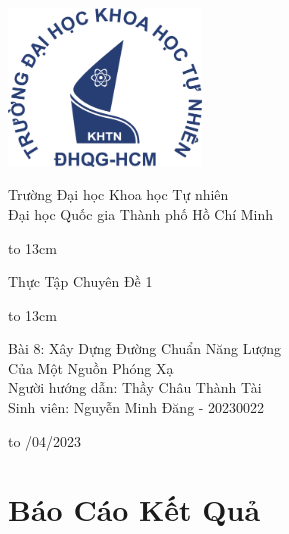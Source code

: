 \documentclass{article}
\begin{document}
\onehalfspacing
{
   \setlength{\topmargin}{-0.5cm}
\begin{titlepage}
  \begin{center}
    \centerline{\includegraphics[height=42mm]{logo}}

    
   \vspace{1cm}

        {\large Trường Đại học Khoa học Tự nhiên}\\[1em]
        {\large Đại học Quốc gia Thành phố Hồ Chí Minh}
    
        \vspace{1.2cm}
    \centerline{\hbox to 13cm{\hrulefill}}
    \vspace{0.3cm}
    \Large  {{Thực Tập Chuyên Đề 1 }}
    \centerline{\hbox to 13cm{\hrulefill}}
    
    \vspace{1.2cm}
    \Large {Bài 8: Xây Dựng Đường Chuẩn Năng Lượng \\ Của Một Nguồn Phóng Xạ}\\ 
   
   \vspace{3cm}
            \large Người hướng dẫn: Thầy Châu Thành Tài \\ 
            \large Sinh viên: Nguyễn Minh Đăng - 20230022
    
    \vspace{4cm}
    

    
    \hbox to \textwidth{\hrulefill}
    \vspace{0.2cm}
    {/04/2023}
    
  \end{center}
\end{titlepage}
}

\newpage
\clearpage\thispagestyle{empty}\addtocounter{page}{-1} 
\clearpage
\mbox{}
\newpage
%
\setcounter{section}{1}
\section*{\centering Báo Cáo Kết Quả}
\vspace{1cm}
%
\end{document}
